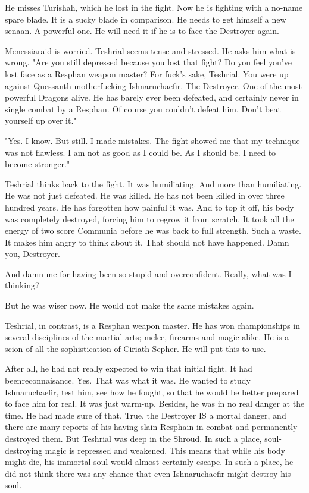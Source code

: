 He misses Turishah, which he lost in the fight. 
Now he is fighting with a no-name spare blade. 
It is a sucky blade in comparison. 
He needs to get himself a new senaan. 
A powerful one. 
He will need it if he is to face the Destroyer again. 

\begin{comment}
\subsection{Worrying}
\end{comment}

Menessiaraid is worried. 
Teshrial seems tense and stressed. 
He asks him what is wrong. 
"Are you still depressed because you lost that fight? 
 Do you feel you've lost face as a Resphan weapon master?
 For fuck's sake, Teshrial.
 You were up against Quessanth motherfucking Ishnaruchaefir. 
 The Destroyer. 
 One of the most powerful Dragons alive. 
 He has barely ever been defeated, and certainly never in single combat by a Resphan. 
 Of course you couldn't defeat him. 
 Don't beat yourself up over it."

"Yes. I know. 
 But still.
 I made mistakes. 
 The fight showed me that my technique was not flawless. 
 I am not as good as I could be. 
 As I should be. 
 I need to become stronger."

Teshrial thinks back to the fight. 
It was humiliating.
And more than humiliating. 
He was not just defeated. 
He was killed. 
He has not been killed in over three hundred years. 
He has forgotten how painful it was. 
And to top it off, his body was completely destroyed, forcing him to regrow it from scratch. 
It took all the energy of two score Communia before he was back to full strength. 
Such a waste. 
It makes him angry to think about it. 
That should not have happened. 
Damn you, Destroyer. 

And damn me for having been so stupid and overconfident. 
Really, what was I thinking?

But he was wiser now. 
He would not make the same mistakes again. 

Teshrial, in contrast, is a Resphan weapon master. 
He has won championships in several disciplines of the martial arts; melee, firearms and magic alike. 
He is a scion of all the sophistication of Ciriath-Sepher. 
He will put this to use. 

After all, he had not really expected to win that initial fight. 
It had been\prikker reconnaisance. 
Yes. 
That was what it was. 
He wanted to study Ishnaruchaefir, test him, see how he fought, so that he would be better prepared to face him for real. 
It was just warm-up. 
Besides, he was in no real danger at the time. 
He had made sure of that. 
True, the Destroyer IS a mortal danger, and there are many reports of his having slain Resphain in combat and permanently destroyed them. 
But Teshrial was deep in the Shroud. 
In such a place, soul-destroying magic is repressed and weakened. 
This means that while his body might die, his immortal soul would almost certainly escape. 
In such a place, he did not think there was any chance that even Ishnaruchaefir might destroy his soul. 

